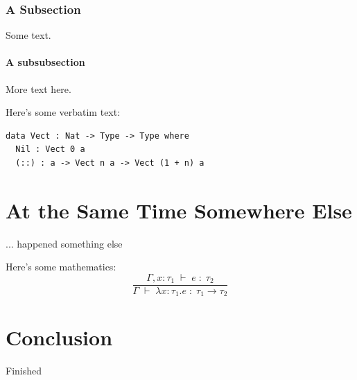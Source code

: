 \documentclass[dejavu]{ituthesis}
\begin{document}
\subsection{A Subsection}
Some text.
\subsubsection{A subsubsection}
More text here.

Here's some verbatim text:
\begin{verbatim}
data Vect : Nat -> Type -> Type where
  Nil : Vect 0 a
  (::) : a -> Vect n a -> Vect (1 + n) a
\end{verbatim}

\chapter{At the Same Time Somewhere Else}
... happened something else

Here's some mathematics:
\begin{displaymath}
  \frac{
    \Gamma, x:\tau_1\;\vdash\; e \;:\; \tau_2
  }{
    \Gamma\;\vdash\;\lambda x : \tau_1 . e \;:\; \tau_1\to\tau_2}
\end{displaymath}

\chapter{Conclusion}
Finished
\end{document}
